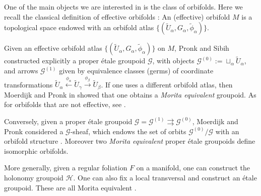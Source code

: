 \documentclass[a4paper]{amsart}
\newcommand{\maG}{\mathcal G}
\newcommand{\maH}{\mathcal H}
\newcommand\<{\langle}
\renewcommand\>{\rangle}
\theoremstyle{definition}
\theoremstyle{remark}
\begin{document}
One of the main objects we are interested in is the class of orbifolds.
Here we recall the classical definition of effective orbifolds \cite{Ruan;Book}:
An (effective) orbifold $M$ is a topological space
endowed with an orbifold atlas $\{ (\tilde U _\alpha , G_\alpha , \tilde \phi_\alpha) \}$.

Given an effective orbifold atlas $\{ (\tilde U _\alpha , G_\alpha , \tilde \phi_\alpha) \}$ on $M$,
Pronk and Sibih \cite{PronkThesis, PSTarXiv} constructed explicitly a proper \'etale groupoid $\maG$,
with objects $\maG ^{(0)} := \sqcup _\alpha \tilde U _\alpha$,
and arrows $\maG ^{(1)}$ given by equivalence classes (germs) of coordinate transformations
$\tilde U _\alpha \xleftarrow{\phi _\alpha} \tilde U _\gamma \xrightarrow{\phi _\beta} \tilde U _\beta $.
If one uses a different orbifold atlas, then Moerdijk and Pronk in \cite{MP97}
showed that one obtains a {\em Morita equivalent} groupoid.
As for orbifolds that are not effective, see \cite{PSTarXiv}. %

Conversely, given a proper \'etale groupoid $\maG = \maG ^{(1)} \rightrightarrows \maG ^{(0)}$,
Moerdijk and Pronk considered a $\maG$-sheaf, which endows the set of orbits $\maG ^{(0)} / \maG$ with an orbifold structure \cite{MP97}.
Moreover two {\em Morita equivalent} proper \'etale groupoids define isomorphic orbifolds.

More generally, given a regular foliation $F$ on a manifold, one can construct the holonomy groupoid $\maH$.
One can also fix a local transversal and construct an \'etale groupoid. These are all Morita equivalent \cite{MoerdijkFolBook}.
\end{document}
